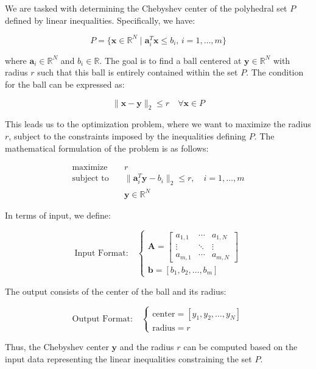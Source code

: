 \documentclass{article}
\begin{document}
We are tasked with determining the Chebyshev center of the polyhedral set \( P \) defined by linear inequalities. Specifically, we have:

\[
P = \{ \mathbf{x} \in \mathbb{R}^N \mid \mathbf{a}_i^T \mathbf{x} \leq b_i, \, i = 1, \ldots, m \}
\]

where \( \mathbf{a}_i \in \mathbb{R}^N \) and \( b_i \in \mathbb{R} \). The goal is to find a ball centered at \( \mathbf{y} \in \mathbb{R}^N \) with radius \( r \) such that this ball is entirely contained within the set \( P \). The condition for the ball can be expressed as:

\[
\|\mathbf{x} - \mathbf{y}\|_2 \leq r \quad \forall \mathbf{x} \in P
\]

This leads us to the optimization problem, where we want to maximize the radius \( r \), subject to the constraints imposed by the inequalities defining \( P \). The mathematical formulation of the problem is as follows:

\[
\begin{align*}
\text{maximize} & \quad r \\
\text{subject to} & \quad \|\mathbf{a}_i^T \mathbf{y} - b_i\|_2 \leq r, \quad i = 1, \ldots, m \\
& \quad \mathbf{y} \in \mathbb{R}^N
\end{align*}
\]

In terms of input, we define:

\[
\text{Input Format:} \quad
\begin{cases}
\mathbf{A} = 
  \begin{bmatrix}
  a_{1,1} & \cdots & a_{1,N} \\
  \vdots & \ddots & \vdots \\
  a_{m,1} & \cdots & a_{m,N}
  \end{bmatrix} \\
\mathbf{b} = [b_1, b_2, \ldots, b_m]
\end{cases}
\]

The output consists of the center of the ball and its radius:

\[
\text{Output Format:} \quad
\begin{cases}
\text{center} = [y_1, y_2, \ldots, y_N] \\
\text{radius} = r
\end{cases}
\]

Thus, the Chebyshev center \( \mathbf{y} \) and the radius \( r \) can be computed based on the input data representing the linear inequalities constraining the set \( P \).
\end{document}
